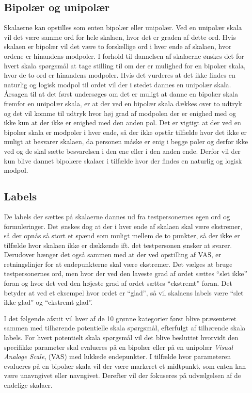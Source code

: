 \subsection{Bipolær og unipolær}
Skalaerne kan opstilles som enten bipolær eller unipolær. Ved en unipolær skala vil det være samme ord for hele skalaen, hvor det er graden af dette ord. Hvis skalaen er bipolær vil det være to forskellige ord i hver ende af skalaen, hvor ordene er hinandens modpoler. \blankline
%
I forhold til dannelsen af skalaerne ønskes det for hvert skala spørgsmål at tage stilling til om der er mulighed for en bipolær skala, hvor de to ord er hinandens modpoler. Hvis det vurderes at det ikke findes en naturlig og logisk modpol til ordet vil der i stedet dannes en unipolær skala. \blankline
%
Årsagen til at det først undersøges om det er muligt at danne en bipolær skala fremfor en unipolær skala, er at der ved en bipolær skala dækkes over to udtryk og det vil komme til udtryk hvor høj grad af modpolen der er enighed med og ikke kun at der ikke er enighed med den anden pol. Det er vigtigt at der ved en bipolær skala er modpoler i hver ende, så der ikke opstår tilfælde hvor det ikke er muligt at besvarer skalaen, da personen måske er enig i begge poler og derfor ikke ved og de skal sætte besvarelsen i den ene eller i den anden ende. Derfor vil der kun blive dannet bipolære skalaer i tilfælde hvor der findes en naturlig og logisk modpol. 
%
\subsection{Labels}
%
De labels der sættes på skalaerne dannes ud fra testpersonernes egen ord og formuleringer. 
Det ønskes dog at der i hver ende af skalaen skal være ekstremer, så der opnås så stort et spænd som muligt mellem de to punkter, så der ikke er tilfælde hvor skalaen ikke er dækkende ift. det testpersonen ønsker at svarer. Derudover hænger det også sammen med at der ved opstilling af VAS, er retningslinjer for at endepunkterne skal være ekstremer.\blankline
%
Det vælges at bruge testpersonernes ord, men hvor der ved den laveste grad af ordet sættes ``slet ikke'' foran og hvor det ved den højeste grad af ordet sættes ``ekstremt'' foran. Det betyder at ved et eksempel hvor ordet er ``glad'', så vil skalaens labels være ``slet ikke glad'' og ``ekstremt glad''. \blankline

I det følgende afsnit vil hver af de 10 grønne kategorier først blive præsenteret sammen med tilhørende potentielle skala spørgsmål, efterfulgt af tilhørende skala labels. For hvert potentielt skala spørgsmål vil det blive besluttet hvorvidt den specifikke parameter skal evalueres på en bipolær eller på en unipolær \textit{Visual Analoge Scale}, (VAS) med lukkede endepunkter. I tilfælde hvor parameteren evalueres på en bipolær skala vil der være markeret et midtpunkt, som enten kan være unavngivet eller navngivet. Derefter vil der fokuseres på udvælgelsen af de endelige skalaer.